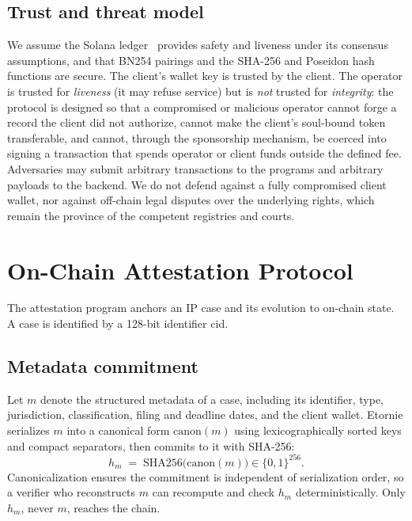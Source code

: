 \documentclass[conference]{IEEEtran}
\begin{document}
\subsection{Trust and threat model}

We assume the Solana ledger~\cite{solana} provides safety and liveness under
its consensus assumptions, and that BN254 pairings and the SHA-256 and Poseidon hash
functions are secure. The client's wallet key is trusted by the client. The
operator is trusted for \emph{liveness} (it may refuse service) but is
\emph{not} trusted for \emph{integrity}: the protocol is designed so that a
compromised or malicious operator cannot forge a record the client did not
authorize, cannot make the client's soul-bound token transferable, and cannot,
through the sponsorship mechanism, be coerced into signing a transaction that
spends operator or client funds outside the defined fee. Adversaries may
submit arbitrary transactions to the programs and arbitrary payloads to the
backend. We do not defend against a fully compromised client wallet, nor
against off-chain legal disputes over the underlying rights, which remain the
province of the competent registries and courts.

\section{On-Chain Attestation Protocol}
\label{sec:att}

The attestation program anchors an IP case and its evolution to on-chain
state. A case is identified by a 128-bit identifier $\mathrm{cid}$.

\subsection{Metadata commitment}

Let $m$ denote the structured metadata of a case, including its identifier,
type, jurisdiction, classification, filing and deadline dates, and the client
wallet. Etornie serializes $m$ into a canonical form
$\mathrm{canon}(m)$ using lexicographically sorted keys and compact
separators, then commits to it with SHA-256:
\begin{equation}
h_m \;=\; \mathrm{SHA256}\big(\mathrm{canon}(m)\big) \in \{0,1\}^{256}.
\end{equation}
Canonicalization ensures the commitment is independent of serialization
order, so a verifier who reconstructs $m$ can recompute and check $h_m$
deterministically. Only $h_m$, never $m$, reaches the chain.
\end{document}
